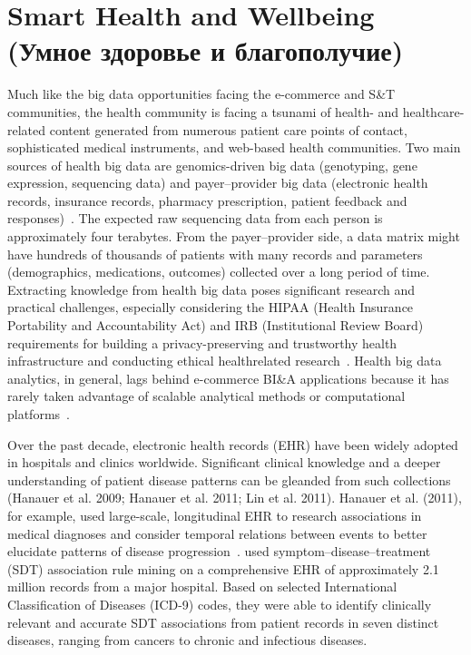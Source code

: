 \section{Smart Health and Wellbeing (Умное здоровье и благополучие)}
Much like the big data opportunities facing the e-commerce
and S\&T communities, the health community is facing a
tsunami of health- and healthcare-related content generated
from numerous patient care points of contact, sophisticated
medical instruments, and web-based health communities.
Two main sources of health big data are genomics-driven big
data (genotyping, gene expression, sequencing data) and
payer–provider big data (electronic health records, insurance
records, pharmacy prescription, patient feedback and
responses)~\cite{Miller:2012a}. The expected raw sequencing data
from each person is approximately four terabytes. From the
payer–provider side, a data matrix might have hundreds of
thousands of patients with many records and parameters
(demographics, medications, outcomes) collected over a long
period of time. Extracting knowledge from health big data
poses significant research and practical challenges, especially
considering the HIPAA (Health Insurance Portability and
Accountability Act) and IRB (Institutional Review Board)
requirements for building a privacy-preserving and trustworthy
health infrastructure and conducting ethical healthrelated
research~\cite{Gelfand:2012}. Health big data analytics,
in general, lags behind e-commerce BI\&A applications
because it has rarely taken advantage of scalable analytical
methods or computational platforms~\cite{Miller:2012a}.

Over the past decade, electronic health records (EHR) have
been widely adopted in hospitals and clinics worldwide.
Significant clinical knowledge and a deeper understanding of
patient disease patterns can be gleanded from such collections
(Hanauer et al. 2009; Hanauer et al. 2011; Lin et al. 2011).
Hanauer et al. (2011), for example, used large-scale, longitudinal
EHR to research associations in medical diagnoses
and consider temporal relations between events to better
elucidate patterns of disease progression~\cite{Lin:2011}.
used symptom–disease–treatment (SDT) association rule
mining on a comprehensive EHR of approximately 2.1
million records from a major hospital. Based on selected
International Classification of Diseases (ICD-9) codes, they
were able to identify clinically relevant and accurate SDT
associations from patient records in seven distinct diseases,
ranging from cancers to chronic and infectious diseases.

